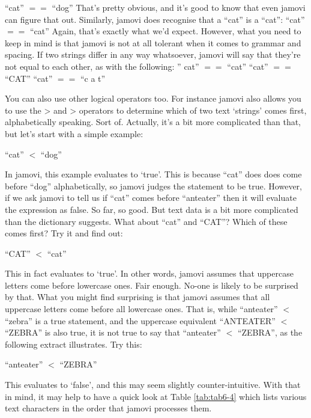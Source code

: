 \documentclass[
]{book}
\begin{document}
``cat'' \(==\) ``dog'' That's pretty obvious, and it's good to know that even jamovi can figure that out. Similarly, jamovi does recognise that a ``cat'' is a ``cat'': ``cat'' \(==\) ``cat'' Again, that's exactly what we'd expect. However, what you need to keep in mind is that jamovi is not at all tolerant when it comes to grammar and spacing. If two strings differ in any way whatsoever, jamovi will say that they're not equal to each other, as with the following: '' cat'' \(==\) ``cat'' ``cat'' \(==\) ``CAT'' ``cat'' \(==\) ``c a t''

You can also use other logical operators too. For instance jamovi also allows you to use the \textgreater{} and \textgreater{} operators to determine which of two text `strings' comes first, alphabetically speaking. Sort of. Actually, it's a bit more complicated than that, but let's start with a simple example:

``cat'' \(<\) ``dog''

In jamovi, this example evaluates to `true'. This is because ``cat'' does does come before ``dog'' alphabetically, so jamovi judges the statement to be true. However, if we ask jamovi to tell us if ``cat'' comes before ``anteater'' then it will evaluate the expression as false. So far, so good. But text data is a bit more complicated than the dictionary suggests. What about ``cat'' and ``CAT''? Which of these comes first? Try it and find out:

``CAT'' \(<\) ``cat''

This in fact evaluates to `true'. In other words, jamovi assumes that uppercase letters come before lowercase ones. Fair enough. No-one is likely to be surprised by that. What you might find surprising is that jamovi assumes that all uppercase letters come before all lowercase ones. That is, while ``anteater'' \(<\) ``zebra'' is a true statement, and the uppercase equivalent ``ANTEATER'' \(<\) ``ZEBRA'' is also true, it is not true to say that ``anteater'' \(<\) ``ZEBRA'', as the following extract illustrates. Try this:

``anteater'' \(<\) ``ZEBRA''

This evaluates to `false', and this may seem slightly counter-intuitive. With that in mind, it may help to have a quick look at Table \ref{tab:tab6-4} which lists various text characters in the order that jamovi processes them.

 
  \providecommand{\huxb}[2]{\arrayrulecolor[RGB]{#1}\global\arrayrulewidth=#2pt}
  \providecommand{\huxvb}[2]{\color[RGB]{#1}\vrule width #2pt}
  \providecommand{\huxtpad}[1]{\rule{0pt}{#1}}
  \providecommand{\huxbpad}[1]{\rule[-#1]{0pt}{#1}}
\end{document}
